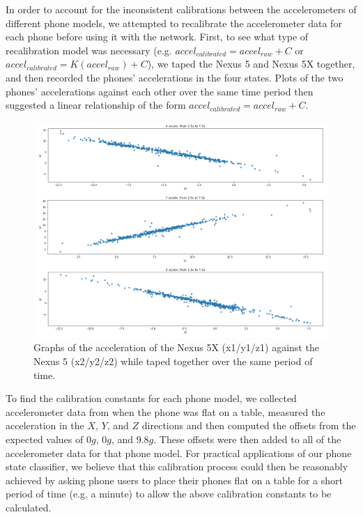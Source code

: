 

In order to account for the inconsistent calibrations between the accelerometers of different phone models, we
attempted to recalibrate the accelerometer data for each phone before using it with the network. 
First, to see what type of recalibration model was necessary (e.g. $accel_{calibrated} = accel_{raw} + C$ or
$accel_{calibrated} = K(accel_{raw}) + C$), we taped the Nexus 5 and Nexus 5X together, and then recorded
the phones' accelerations in the four states. Plots of the two phones' accelerations against each other over the same time period
then suggested a linear relationship of the form $accel_{calibrated} = accel_{raw} + C$. 

\begin{figure}[!h]
\center
\includegraphics[scale=0.5]{two_phones}
\caption{Graphs of the acceleration of the Nexus 5X (x1/y1/z1) against the Nexus 5 (x2/y2/z2) while taped together over the same period of time.}
\end{figure}

To find the calibration constants for each phone model, we collected accelerometer
data from when the phone was flat on a table, measured the acceleration in the
$X$, $Y$, and $Z$ directions and then computed the offsets from the expected values of
$0g$, $0g$, and $9.8g$. These offsets were then added to all of the accelerometer data for that phone model.
For practical applications of our phone state classifier, we believe that this calibration process
could then be reasonably achieved by asking phone users to place their phones flat on a table for a short period of time (e.g. a minute)
to allow the above calibration constants to be calculated.


